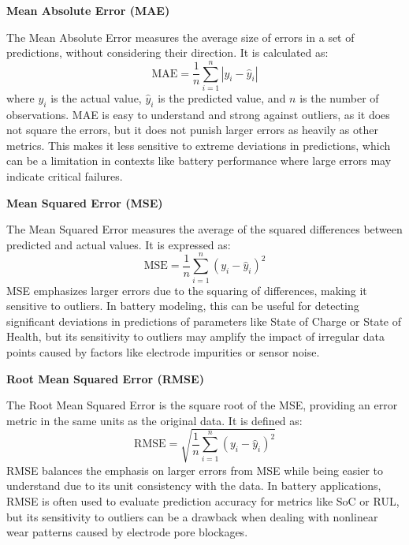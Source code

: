 \textbf{Mean Absolute Error (MAE)}

The Mean Absolute Error measures the average size of errors in a set of predictions, without considering their direction. It is calculated as:
\begin{equation}
\text{MAE} = \frac{1}{n} \sum_{i=1}^{n} |y_i - \hat{y}_i|
\end{equation}
where $y_i$ is the actual value, $\hat{y}_i$ is the predicted value, and $n$ is the number of observations. MAE is easy to understand and strong against outliers, as it does not square the errors, but it does not punish larger errors as heavily as other metrics. This makes it less sensitive to extreme deviations in predictions, which can be a limitation in contexts like battery performance where large errors may indicate critical failures.

\vspace{1cm}
\textbf{Mean Squared Error (MSE)}

The Mean Squared Error measures the average of the squared differences between predicted and actual values. It is expressed as:
\begin{equation}
\text{MSE} = \frac{1}{n} \sum_{i=1}^{n} (y_i - \hat{y}_i)^2
\end{equation}
MSE emphasizes larger errors due to the squaring of differences, making it sensitive to outliers. In battery modeling, this can be useful for detecting significant deviations in predictions of parameters like State of Charge or State of Health, but its sensitivity to outliers may amplify the impact of irregular data points caused by factors like electrode impurities or sensor noise.

\vspace{1cm}
\textbf{Root Mean Squared Error (RMSE)}

The Root Mean Squared Error is the square root of the MSE, providing an error metric in the same units as the original data. It is defined as:
\begin{equation}
\text{RMSE} = \sqrt{\frac{1}{n} \sum_{i=1}^{n} (y_i - \hat{y}_i)^2}
\end{equation}
RMSE balances the emphasis on larger errors from MSE while being easier to understand due to its unit consistency with the data. In battery applications, RMSE is often used to evaluate prediction accuracy for metrics like SoC or RUL, but its sensitivity to outliers can be a drawback when dealing with nonlinear wear patterns caused by electrode pore blockages.


